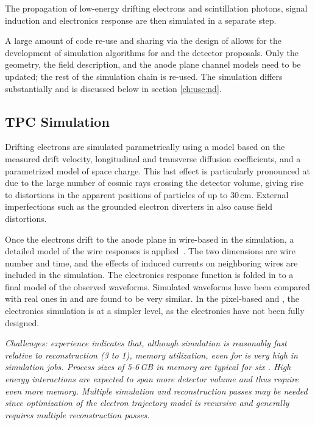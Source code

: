 \documentclass[../main-v1.tex]{subfiles}
\begin{document}
The propagation of low-energy drifting electrons and scintillation photons, signal induction  and electronics response are then simulated in a separate step.  

A large amount of code re-use and sharing via the design of  allows for the development of simulation algorithms for  %
and the   detector proposals.  Only the geometry, the field description,  and the anode plane channel models need to be updated; the rest of the simulation chain is re-used.  The  simulation differs substantially and is discussed below in 
section \ref{ch:use:nd}.

\subsection{TPC Simulation}

Drifting electrons are simulated parametrically using a model based on the measured drift velocity, longitudinal and transverse diffusion coefficients, and a parametrized model of space charge.  This last effect is particularly pronounced at  due to the large number of cosmic rays crossing the detector volume, giving rise to distortions in the apparent positions of particles of up to 30\,cm.  %
External imperfections such as the grounded electron diverters in  also cause field distortions.

Once the electrons drift to the anode plane in wire-based  in the simulation, a detailed \twod model of the wire responses is applied~\cite{Abi:2020mwi}.  The two dimensions are wire number and time, and the effects of induced currents on neighboring wires are included in the simulation.  The electronics response function is folded in to a final model of the observed waveforms.  Simulated waveforms have been compared with real ones  in  and are found to be very similar.
In the pixel-based  and , the electronics simulation is at a simpler level, as the electronics have not been fully designed.

{\it Challenges:   experience indicates that, although simulation is reasonably fast relative to reconstruction (3 to 1), memory utilization, even for  %
is very high in simulation jobs.  Process sizes of 5-6\,GB in memory are typical for six .  High energy  interactions are expected to span more detector volume and thus require even more memory. Multiple %
simulation and reconstruction passes may be needed since optimization of the electron trajectory model is recursive and generally requires multiple reconstruction passes. }
\end{document}
